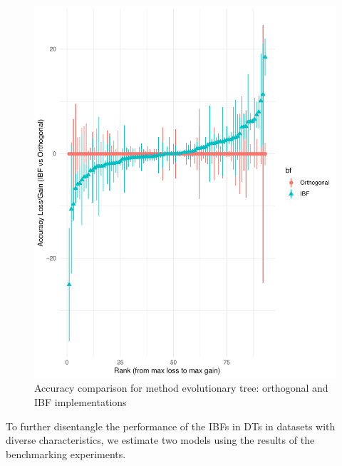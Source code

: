 \documentclass[]{elsarticle} %
\makeatletter
\def\maxwidth{\ifdim\Gin@nat@width>\linewidth\linewidth
\else\Gin@nat@width\fi}
\let\Oldincludegraphics\includegraphics
\renewcommand{\includegraphics}[1]{\Oldincludegraphics[width=\maxwidth]{#1}}
\makeatother
\begin{document}
\begin{figure}
\centering
\includegraphics{Trees_with_Base_Functions_v3_files/figure-latex/fig11-accuracy-ev-1.pdf}
\caption{\label{fig:fig11-accuracy-ev}Accuracy comparison for method
evolutionary tree: orthogonal and IBF implementations}
\end{figure}

To further disentangle the performance of the IBFs in DTs in datasets
with diverse characteristics, we estimate two models using the results
of the benchmarking experiments.
\end{document}
